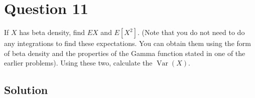 \section*{Question 11}

If \( X \) has beta density, find \( E X \) and \( E\left[X^{2}\right] \).
(Note that you do not need to do any integrations to find these expectations.
You can obtain them using the form of beta density and the properties of the Gamma function stated in one of the earlier problems).
Using these two, calculate the \( \operatorname{Var}(X) \).

\subsection*{Solution}
